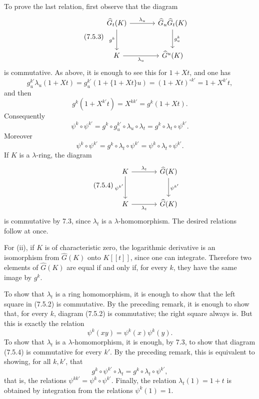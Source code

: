 \documentclass[11pt]{article}
\begin{document}
To prove the last relation, first observe that the diagram
\begin{equation}\tag{7.5.3}
\begin{tikzcd}[column sep=large,row sep=large]
\widehat G_t(K) \arrow[r,"\lambda_u"] \arrow[d,"g^k"'] &
\widehat G_u\widehat G_t(K) \arrow[d,"g^k_u"]\\
K \arrow[r,"\lambda_u"'] &
\widehat G^u(K)
\end{tikzcd}
\end{equation}
is commutative. As above, it is enough to see this for \(1+Xt\), and one has
\[
  g^{k'}_u\lambda_u(1+Xt)
  =
  g^{k'}_u(1+\{1+Xt\}u)
  =
  (1+Xt)^{\circ k'}
  =
  1+X^{k'}t,
\]
and then
\[
  g^k(1+X^{k'}t)=X^{kk'}=g^k(1+Xt).
\]
Consequently
\[
  \psi^k\circ\psi^{k'}
  =
  g^k\circ g^{k'}_u\circ\lambda_u\circ\lambda_t
  =
  g^k\circ\lambda_t\circ\psi^{k'}.
\]
Moreover
\[
  \psi^k\circ\psi^{k'}
  =
  g^k\circ\lambda_t\circ\psi^{k'}
  =
  \psi^k\circ\lambda_t\circ\psi^{k'}.
\]
If \(K\) is a \(\lambda\)-ring, the diagram
\begin{equation}\tag{7.5.4}
\begin{tikzcd}[column sep=large,row sep=large]
K \arrow[r,"\lambda_t"] \arrow[d,"\psi^{k'}"'] &
\widehat G(K) \arrow[d,"\psi^{k'}"]\\
K \arrow[r,"\lambda_t"'] &
\widehat G(K)
\end{tikzcd}
\end{equation}
is commutative by 7.3, since \(\lambda_t\) is a \(\lambda\)-homomorphism. The desired relations follow at once.

For (ii), if \(K\) is of characteristic zero, the logarithmic derivative is an isomorphism from \(\widehat G(K)\) onto \(K[[t]]\), since one can integrate. Therefore two elements of \(\widehat G(K)\) are equal if and only if, for every \(k\), they have the same image by \(g^k\).

To show that \(\lambda_t\) is a ring homomorphism, it is enough to show that the left square in (7.5.2) is commutative. By the preceding remark, it is enough to show that, for every \(k\), diagram (7.5.2) is commutative; the right square always is. But this is exactly the relation
\[
  \psi^k(xy)=\psi^k(x)\psi^k(y).
\]
To show that \(\lambda_t\) is a \(\lambda\)-homomorphism, it is enough, by 7.3, to show that diagram (7.5.4) is commutative for every \(k'\). By the preceding remark, this is equivalent to showing, for all \(k,k'\), that
\[
  g^k\circ\psi^{k'}\circ\lambda_t
  =
  g^k\circ\lambda_t\circ\psi^{k'},
\]
that is, the relations \(\psi^{kk'}=\psi^k\circ\psi^{k'}\). Finally, the relation \(\lambda_t(1)=1+t\) is obtained by integration from the relations \(\psi^k(1)=1\).
\end{document}
